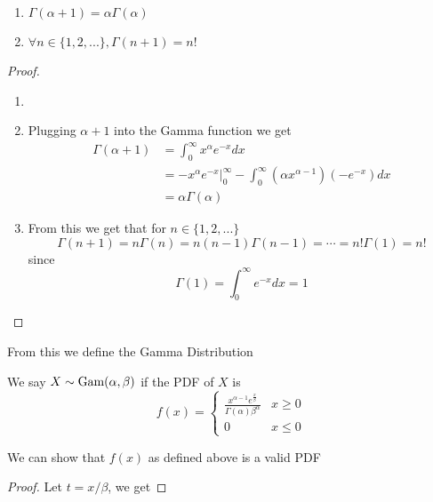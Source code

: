 \begin{theorem}
    $ $
    \begin{enumerate}
        \item $\Gamma(\alpha+1)=\alpha\Gamma(\alpha)$
        \item $\forall n\in\{1,2,...\},\Gamma(n+1)=n!$
    \end{enumerate}
    \begin{proof}
        \begin{enumerate}
            \item[]
            \item Plugging $\alpha+1$ into the Gamma function we get
            \begin{align*}
                \Gamma(\alpha+1) & = \int_0^\infty x^{\alpha} e^{-x} dx
                \\             & = -x^\alpha e^{-x}\Big\vert_0^\infty - \int_0^\infty (\alpha x^{\alpha-1}) (-e^{-x}) dx \tag{Using integration by parts}
                \\             & = \alpha \Gamma(\alpha)
            \end{align*}
            \item From this we get that for $n\in\{1,2,...\}$
            \[
                \Gamma(n+1)=n\Gamma(n)=n(n-1)\Gamma(n-1)= \cdots = n! \Gamma(1) = n!
            \]
            since
            \[
                \Gamma(1)=\int_0^\infty e^{-x} dx=1
            \]
        \end{enumerate}
    \end{proof}
\end{theorem}



From this we define the Gamma Distribution
\begin{definition}
    We say $X\sim\textup{Gam}(\alpha,\beta)$ if the PDF of $X$ is
    \[
        f(x)=\begin{cases}
            \displaystyle\frac {x^{\alpha-1} e^{\frac x \beta}}{\Gamma(\alpha)\beta^\alpha} & x \ge 0
            \\
            0 & x \le 0
        \end{cases}
    \]
\end{definition}
We can show that $f(x)$ as defined above is a valid PDF
\begin{proof}
    Let $t=x/\beta$, we get

\end{proof}

